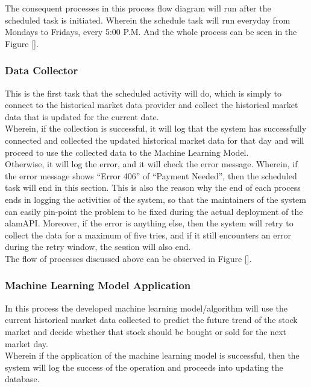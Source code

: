 The consequent processes in this process flow diagram will run after the 
scheduled task is initiated. Wherein the schedule task will run everyday from 
Mondays to Fridays, every 5:00 P.M. And the whole process can be seen in the 
Figure \ref{}.
\subsubsection{Data Collector}
\label{subsubsec:data_ollector}
This is the first task that the scheduled 
activity will do, which is simply to connect to the historical market 
data provider and collect the historical market data that is updated for 
the current date.
\hfill \\

Wherein, if the collection is successful, it will log that 
the system has successfully connected and collected the updated 
historical market data for that day and will proceed to use the 
collected data to the Machine Learning Model.
\hfill \\

Otherwise, it will log the error, and it will check the error message. 
Wherein, if the error message shows “Error 406” of “Payment Needed”, 
then the scheduled task will end in this section. This is also the reason why 
the end of each process ends in logging the activities of the system, so that 
the maintainers of the system can easily pin-point the problem to be fixed during 
the actual deployment of the alamAPI. Moreover, if the error is anything else, 
then the system will retry to collect the data for a maximum of five tries, and 
if it still encounters an error during the retry window, the session will also end.
\hfill \\

The flow of processes discussed above can be observed in Figure \ref{}.
\subsubsection{Machine Learning Model Application}
\label{subsubsec:ml_application}
In this process the developed machine learning model/algorithm will use the 
current historical market data collected to predict the future trend of the 
stock market and decide whether that stock should be bought or sold for 
the next market day.
\hfill \\

Wherein if the application of the machine learning model is successful, 
then the system will log the success of the operation and proceeds into 
updating the database.
\hfill \\

